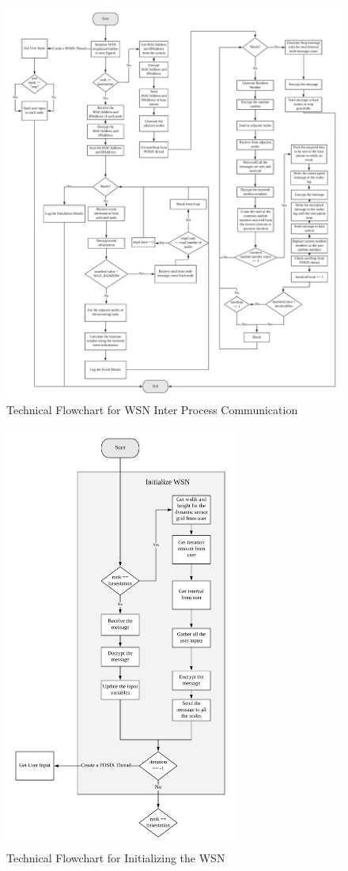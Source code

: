 \documentclass[conference]{IEEEtran}
\begin{document}
	\begin{figure}[ht]
		\centering
		\includegraphics[width=7in]{arc}
		\caption{Technical Flowchart for WSN Inter Process Communication}
		\label{arc}
	\end{figure}

	\begin{figure}[ht]
	\centering
	\includegraphics[width=3in]{inWSN}
	\caption{Technical Flowchart for Initializing the WSN}
	\label{inWSN}
\end{figure}
	
\end{document}
